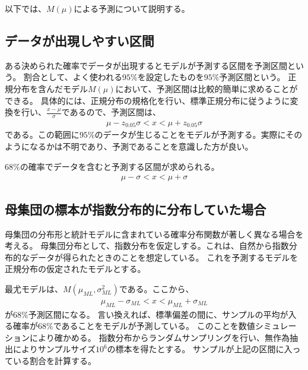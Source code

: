以下では、$M(\mu)$による予測について説明する。


\fi


\fi

\subsection{データが出現しやすい区間}
ある決められた確率でデータが出現するとモデルが予測する区間を予測区間という。
割合として、よく使われる$95\%$を設定したものを$95\%$予測区間という。
正規分布を含んだモデル$M(\mu)$において、予測区間は比較的簡単に求めることができる。
具体的には、正規分布の規格化を行い、標準正規分布に従うように変換を行い、$\frac{x-\mu}{\sigma}$であるので、予測区間は、
\begin{eqnarray*}
    \mu-z_{0.05}\sigma < x < \mu+z_{0.05}\sigma
\end{eqnarray*}
である。この範囲に$95\%$のデータが生じることをモデルが予測する。実際にそのようになるかは不明であり、予測であることを意識した方が良い。

$68\%$の確率でデータを含むと予測する区間が求められる。
\begin{eqnarray*}
    \mu-\sigma < x < \mu+\sigma
\end{eqnarray*}

\subsection{母集団の標本が指数分布的に分布していた場合}
母集団の分布形と統計モデルに含まれている確率分布関数が著しく異なる場合を考える。
母集団分布として、指数分布を仮定しする。これは、自然から指数分布的なデータが得られたときのことを想定している。
これを予測するモデルを正規分布の仮定されたモデルとする。

最尤モデルは、$M(\mu_{ML},\sigma^2_{ML})$である。ここから、
\begin{eqnarray*}
    \mu_{ML}-\sigma_{ML} < x < \mu_{ML}+\sigma_{ML}
\end{eqnarray*}
が$68\%$予測区間になる。
言い換えれば、標準偏差の間に、サンプルの平均が入る確率が$68\%$であることをモデルが予測している。
このことを数値シミュレーションにより確かめる。
指数分布からランダムサンプリングを行い、無作為抽出によりサンプルサイズ$10^6$の標本を得たとする。
サンプルが上記の区間に入っている割合を計算する。


